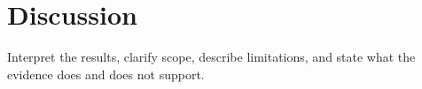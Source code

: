 \section{Discussion}

Interpret the results, clarify scope, describe limitations, and state what the
evidence does and does not support.
